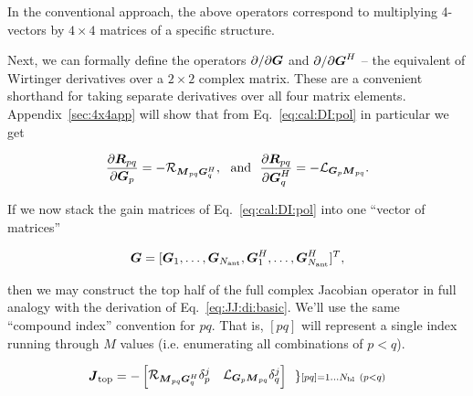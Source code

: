 \documentclass[useAMS,usenatbib]{mn2e}
\newcommand{\mat}[1]{{\bmath{#1}}}
\newcommand{\JJ}{\mat{J}} %
\newcommand{\MM}{\mat{M}}
\newcommand{\RR}{\mat{R}}
\newcommand{\GG}{\mat{G}}
\begin{document}
In the conventional approach, the above operators correspond to multiplying 4-vectors by $4\times4$ matrices of a specific structure.

Next, we can formally define the operators $\partial/\partial\GG$ and $\partial/\partial\GG^H$ -- the equivalent of 
Wirtinger derivatives over a $2\times2$ complex matrix. These are a convenient shorthand for taking separate 
derivatives over all four matrix elements. Appendix~\ref{sec:4x4app} will show that from Eq.~\ref{eq:cal:DI:pol} in particular
we get


\begin{equation}
\label{eq:dR:dG}
\frac{\partial\RR_{pq}}{\partial\GG_p} = -\Rop{\MM_{pq}\GG^H_q},\mathrm{~~and~~}
\frac{\partial\RR_{pq}}{\partial\GG^H_q} = -\Lop{\GG_p \MM_{pq}}.
\end{equation}

If we now stack the gain matrices of Eq.~\ref{eq:cal:DI:pol} into one ``vector of matrices'' 

\begin{equation}
\label{eq:GGvec}
\GG = [ \GG_1,\dots,\GG_{\scriptstyle \Na},\GG^H_1,\dots,\GG^H_{\scriptstyle \Na} ]^T,
\end{equation}

then we may construct the top half of the full complex Jacobian operator in full analogy with the 
derivation of Eq.~\ref{eq:JJ:di:basic}. We'll use the same ``compound index'' convention for $pq$. That is, 
$[pq]$ will represent a single index running through $M$ values (i.e. enumerating all combinations of $p<q$).

\begin{equation}
\label{eq:JJtop}
\JJ_\mathrm{top} = - \Matrix{cc}{ 
\Rop{ \MM_{pq}\GG^H_q }\delta^j_p & 
\Lop{ \GG_p \MM_{pq}  }\delta^j_q 
} ~~ \} \scriptstyle [pq]=1\dots \Nbl~(p<q)
% 
\end{equation}
\end{document}
